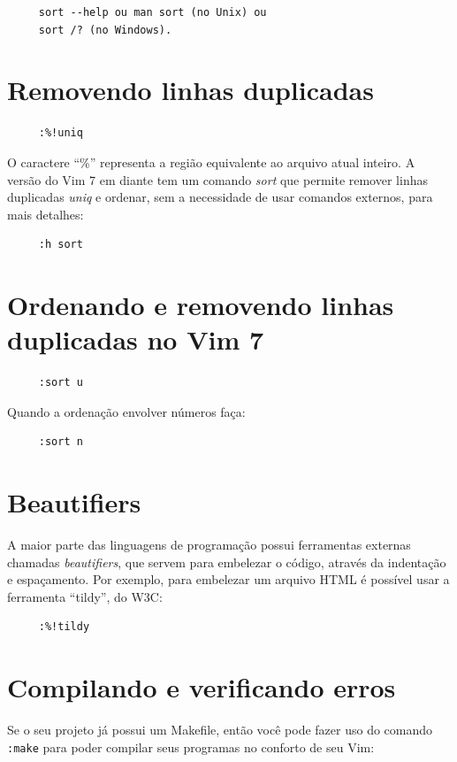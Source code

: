 \documentclass[10pt,a4paper,openany]{book}
\begin{document}
\begin{verbatim}
     sort --help ou man sort (no Unix) ou
     sort /? (no Windows).
\end{verbatim}

\section{Removendo linhas duplicadas}

\begin{verbatim}
     :%!uniq
\end{verbatim}

O caractere ``\%'' representa a região equivalente ao arquivo atual inteiro.
A versão do Vim 7 em diante tem um comando {\em sort} que permite remover
linhas duplicadas {\em uniq} e ordenar, sem a necessidade de usar comandos
externos, para mais detalhes:

\begin{verbatim}
     :h sort
\end{verbatim}

\section{Ordenando e removendo linhas duplicadas no Vim 7}

\begin{verbatim}
     :sort u
\end{verbatim}

Quando a ordenação envolver números faça:

\begin{verbatim}
     :sort n
\end{verbatim}

\section{Beautifiers}

A maior parte das linguagens de programação possui ferramentas
externas chamadas {\em beautifiers}, que servem para embelezar o código,
através da indentação e espaçamento. Por exemplo, para embelezar um
arquivo HTML é possível usar a ferramenta ``tildy'', do W3C:

\begin{verbatim}
     :%!tildy
\end{verbatim}

\section{Compilando e verificando erros}
Se o seu projeto já possui um Makefile, então você pode fazer uso do comando
{\tt :make} para poder compilar seus programas no conforto de seu Vim:
\end{document}
